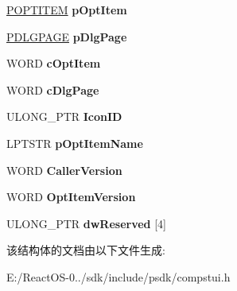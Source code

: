 \begin{DoxyCompactItemize}
\hyperlink{struct___o_p_t_i_t_e_m}{P\+O\+P\+T\+I\+T\+EM} {\bfseries p\+Opt\+Item}
\item 
\mbox{\label{struct___c_o_m_p_r_o_p_s_h_e_e_t_u_i_a7d6b1f74f00fa3f51398eb5d6caa5640}} 
\hyperlink{struct___d_l_g_p_a_g_e}{P\+D\+L\+G\+P\+A\+GE} {\bfseries p\+Dlg\+Page}
\item 
\mbox{\label{struct___c_o_m_p_r_o_p_s_h_e_e_t_u_i_a5a3b627d644c0f98687a106a208046e3}} 
W\+O\+RD {\bfseries c\+Opt\+Item}
\item 
\mbox{\label{struct___c_o_m_p_r_o_p_s_h_e_e_t_u_i_aba0e5ed7ac0b33e63916596509a2db71}} 
W\+O\+RD {\bfseries c\+Dlg\+Page}
\item 
\mbox{\label{struct___c_o_m_p_r_o_p_s_h_e_e_t_u_i_ac10ffe2e390cc733d44a1e2ce769496f}} 
U\+L\+O\+N\+G\+\_\+\+P\+TR {\bfseries Icon\+ID}
\item 
\mbox{\label{struct___c_o_m_p_r_o_p_s_h_e_e_t_u_i_a8bbe54550ef65a314312f7369a122742}} 
L\+P\+T\+S\+TR {\bfseries p\+Opt\+Item\+Name}
\item 
\mbox{\label{struct___c_o_m_p_r_o_p_s_h_e_e_t_u_i_a5cb2c9cc559674ef98ee860880187193}} 
W\+O\+RD {\bfseries Caller\+Version}
\item 
\mbox{\label{struct___c_o_m_p_r_o_p_s_h_e_e_t_u_i_aaa0e8f98b7d418b514360d4175238a38}} 
W\+O\+RD {\bfseries Opt\+Item\+Version}
\item 
\mbox{\label{struct___c_o_m_p_r_o_p_s_h_e_e_t_u_i_aafd5479fdc4878bbd0395ecb658c0e6c}} 
U\+L\+O\+N\+G\+\_\+\+P\+TR {\bfseries dw\+Reserved} \mbox{[}4\mbox{]}
\end{DoxyCompactItemize}


该结构体的文档由以下文件生成\+:\begin{DoxyCompactItemize}
\item 
E\+:/\+React\+O\+S-\/0../sdk/include/psdk/compstui.\+h\end{DoxyCompactItemize}
